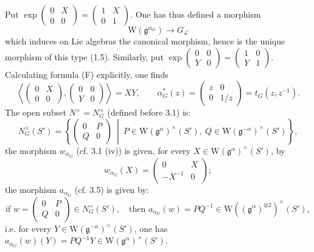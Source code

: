  Put $\exp\left(\begin{smallmatrix}0&X\\0&0\end{smallmatrix}\right)=\left(\begin{smallmatrix}1&X\\0&1\end{smallmatrix}\right)$. One has thus defined a morphism
\[
\mathrm W(\mathfrak g^{\alpha_G})\to G_{\mathcal L}
\]
which induces on Lie algebras the canonical morphism, hence is the unique morphism of this type (1.5). Similarly, put $\exp\left(\begin{smallmatrix}0&0\\Y&0\end{smallmatrix}\right)=\left(\begin{smallmatrix}1&0\\Y&1\end{smallmatrix}\right)$. Calculating formula (F) explicitly, one finds
\[
\left\langle\begin{pmatrix}0&X\\0&0\end{pmatrix},\begin{pmatrix}0&0\\Y&0\end{pmatrix}\right\rangle=XY,\qquad
\alpha_G^*(z)=\begin{pmatrix}z&0\\0&1/z\end{pmatrix}=t_G(z,z^{-1}).
\]
{\renewcommand{\thefootnote}{(32)}}%
The open subset $N^\times=N_G^\times$ (defined before 3.1) is:
\[
N_G^\times(S')=\left\{\begin{pmatrix}0&P\\Q&0\end{pmatrix}\ \middle|\ P\in\mathrm W(\mathfrak g^\alpha)^\times(S'),\ Q\in\mathrm W(\mathfrak g^{-\alpha})^\times(S')\right\},
\]
the morphism $w_{\alpha_G}$ (cf. 3.1 (iv)) is given, for every $X\in\mathrm W(\mathfrak g^\alpha)^\times(S')$, by
\[
w_{\alpha_G}(X)=\begin{pmatrix}0&X\\-X^{-1}&0\end{pmatrix};
\]
the morphism $a_{\alpha_G}$ (cf. 3.5) is given by:
\[
\text{if }w=\begin{pmatrix}0&P\\Q&0\end{pmatrix}\in N_G^\times(S'),\quad
\text{then }a_{\alpha_G}(w)=PQ^{-1}\in\mathrm W((\mathfrak g^\alpha)^{\otimes2})^\times(S'),
\]
i.e. for every $Y\in\mathrm W(\mathfrak g^{-\alpha})^\times(S')$, one has $a_{\alpha_G}(w)(Y)=PQ^{-1}Y\in\mathrm W(\mathfrak g^\alpha)^\times(S')$.

